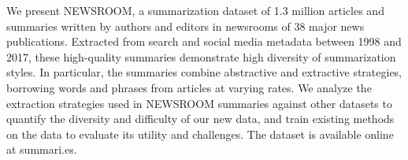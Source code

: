 We present NEWSROOM, a summarization dataset of 1.3 million articles and summaries written by authors and editors in newsrooms of 38 major news publications. Extracted from search and social media metadata between 1998 and 2017, these high-quality summaries demonstrate high diversity of summarization styles. In particular, the summaries combine abstractive and extractive strategies, borrowing words and phrases from articles at varying rates. We analyze the extraction strategies used in NEWSROOM summaries against other datasets to quantify the diversity and difficulty of our new data, and train existing methods on the data to evaluate its utility and challenges. The dataset is available online at summari.es.
